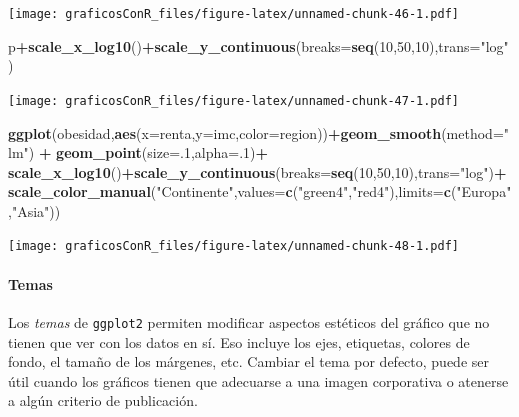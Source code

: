 \documentclass[]{article}
\newenvironment{Shaded}{\begin{snugshade}}{\end{snugshade}}
\newcommand{\DataTypeTok}[1]{\textcolor[rgb]{0.13,0.29,0.53}{#1}}
\newcommand{\DecValTok}[1]{\textcolor[rgb]{0.00,0.00,0.81}{#1}}
\newcommand{\KeywordTok}[1]{\textcolor[rgb]{0.13,0.29,0.53}{\textbf{#1}}}
\newcommand{\NormalTok}[1]{#1}
\newcommand{\OperatorTok}[1]{\textcolor[rgb]{0.81,0.36,0.00}{\textbf{#1}}}
\newcommand{\StringTok}[1]{\textcolor[rgb]{0.31,0.60,0.02}{#1}}
\let\oldparagraph\paragraph
\renewcommand{\paragraph}[1]{\oldparagraph{#1}\mbox{}}
\numberwithin{ejcnt}{section}
\begin{document}
\texttt{[image: graficosConR\_files/figure-latex/unnamed-chunk-46-1.pdf]}

\begin{Shaded}
\begin{Highlighting}[]
\NormalTok{p}\OperatorTok{+}\KeywordTok{scale_x_log10}\NormalTok{()}\OperatorTok{+}\KeywordTok{scale_y_continuous}\NormalTok{(}\DataTypeTok{breaks=}\KeywordTok{seq}\NormalTok{(}\DecValTok{10}\NormalTok{,}\DecValTok{50}\NormalTok{,}\DecValTok{10}\NormalTok{),}\DataTypeTok{trans=}\StringTok{"log"}\NormalTok{)}
\end{Highlighting}
\end{Shaded}

\texttt{[image: graficosConR\_files/figure-latex/unnamed-chunk-47-1.pdf]}

\begin{Shaded}
\begin{Highlighting}[]
\KeywordTok{ggplot}\NormalTok{(obesidad,}\KeywordTok{aes}\NormalTok{(}\DataTypeTok{x=}\NormalTok{renta,}\DataTypeTok{y=}\NormalTok{imc,}\DataTypeTok{color=}\NormalTok{region))}\OperatorTok{+}\KeywordTok{geom_smooth}\NormalTok{(}\DataTypeTok{method=}\StringTok{"lm"}\NormalTok{) }\OperatorTok{+}\StringTok{ }
\StringTok{  }\KeywordTok{geom_point}\NormalTok{(}\DataTypeTok{size=}\NormalTok{.}\DecValTok{1}\NormalTok{,}\DataTypeTok{alpha=}\NormalTok{.}\DecValTok{1}\NormalTok{)}\OperatorTok{+}
\StringTok{  }\KeywordTok{scale_x_log10}\NormalTok{()}\OperatorTok{+}\KeywordTok{scale_y_continuous}\NormalTok{(}\DataTypeTok{breaks=}\KeywordTok{seq}\NormalTok{(}\DecValTok{10}\NormalTok{,}\DecValTok{50}\NormalTok{,}\DecValTok{10}\NormalTok{),}\DataTypeTok{trans=}\StringTok{"log"}\NormalTok{)}\OperatorTok{+}
\StringTok{  }\KeywordTok{scale_color_manual}\NormalTok{(}\StringTok{"Continente"}\NormalTok{,}\DataTypeTok{values=}\KeywordTok{c}\NormalTok{(}\StringTok{"green4"}\NormalTok{,}\StringTok{"red4"}\NormalTok{),}\DataTypeTok{limits=}\KeywordTok{c}\NormalTok{(}\StringTok{"Europa"}\NormalTok{,}\StringTok{"Asia"}\NormalTok{))}
\end{Highlighting}
\end{Shaded}

\texttt{[image: graficosConR\_files/figure-latex/unnamed-chunk-48-1.pdf]}

\hypertarget{temas}{%
\paragraph{Temas}\label{temas}}

Los \emph{temas} de \texttt{ggplot2} permiten modificar aspectos estéticos del gráfico que no tienen que ver con los datos en sí. Eso incluye los ejes, etiquetas, colores de fondo, el tamaño de los márgenes, etc. Cambiar el tema por defecto, puede ser útil cuando los gráficos tienen que adecuarse a una imagen corporativa o atenerse a algún criterio de publicación.
\end{document}
